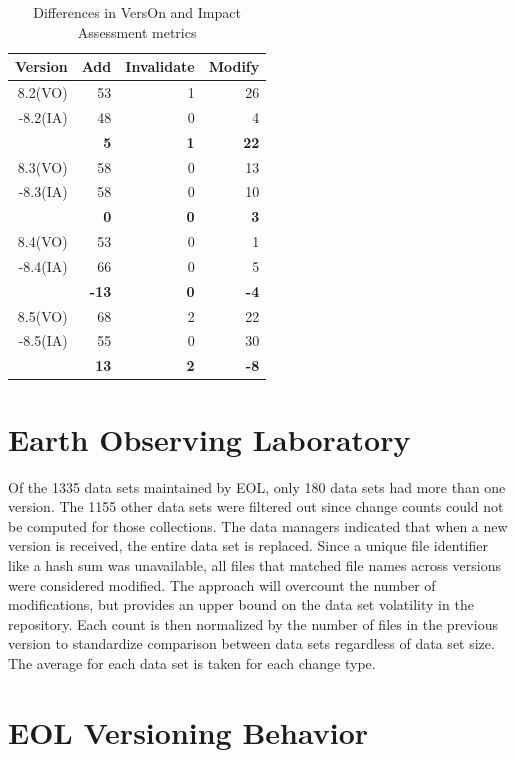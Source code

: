 \begin{table}
	\caption{Differences in VersOn and Impact Assessment metrics}
	\label{table:GCMD_metric}
	\centering
	\begin{tabular}{|r|r|r|r|}
		\hline
		Version & Add & Invalidate & Modify\\ \hline
		8.2(VO)&	53&	1&	26\\
		-8.2(IA)&	48&	0&	4\\
		\hline
		&	\textbf{5}&	\textbf{1}&	\textbf{22}\\
		\hline
		8.3(VO)&	58&	0&	13\\
		-8.3(IA)&	58&	0&	10\\
		\hline
		&	\textbf{0}&	\textbf{0}&	\textbf{3}\\
		\hline
		8.4(VO)&	53&	0&	1\\
		-8.4(IA)&	66&	0&	5\\
		\hline
		&	\textbf{-13}&	\textbf{0}&	\textbf{-4}\\
		\hline
		8.5(VO)&	68&	2&	22\\
		-8.5(IA)&	55&	0&	30\\
		\hline
		&	\textbf{13}&	\textbf{2}&	\textbf{-8}\\						
		\hline
	\end{tabular}
\end{table}

\section{Earth Observing Laboratory}

Of the 1335 data sets maintained by EOL, only 180 data sets had more than one version.  
The 1155 other data sets were filtered out since change counts could not be computed for those collections.  
The data managers indicated that when a new version is received, the entire data set is replaced.  
Since a unique file identifier like a hash sum was unavailable, all files that matched file names across versions were considered modified.  
The approach will overcount the number of modifications, but provides an upper bound on the data set volatility in the repository.  
Each count is then normalized by the number of files in the previous version to standardize comparison between data sets regardless of data set size.  
The average for each data set is taken for each change type.

\section{EOL Versioning Behavior}

